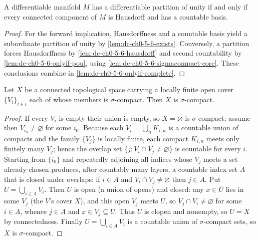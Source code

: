 \begin{theorem}
  \label{thm:dc-ch0-5-6}
  A differentiable manifold $M$ has a differentiable partition of unity if and only
  if every connected component of $M$ is Hausdorff and has a countable basis.
\end{theorem}
\begin{proof}
  \sketch
  \leanok
  For the forward implication, Hausdorffness and a countable basis yield a subordinate
  partition of unity by \cref{lem:dc-ch0-5-6-exists}. Conversely, a partition forces
  Hausdorffness by \cref{lem:dc-ch0-5-6-hausdorff} and second countability by
  \cref{lem:dc-ch0-5-6-onlyif-pou}, using
  \cref{lem:dc-ch0-5-6-sigmacompact-core}. These conclusions combine in
  \cref{lem:dc-ch0-5-6-onlyif-complete}.
\end{proof}

\begin{lemma}
  \label{lem:dc-ch0-5-6-sigmacompact-core}
  \leanok
  Let $X$ be a connected topological space carrying a locally finite open cover
  $\{V_i\}_{i\in\iota}$ each of whose members is $\sigma$-compact. Then $X$ is
  $\sigma$-compact.
\end{lemma}
\begin{proof}
  \sketch
  \leanok
  If every $V_i$ is empty their union is empty, so $X=\varnothing$ is
  $\sigma$-compact; assume then $V_{i_0}\neq\varnothing$ for some $i_0$. Because each
  $V_i=\bigcup_n K_{i,n}$ is a countable union of compacts and the family
  $\{V_j\}$ is locally finite, each compact $K_{i,n}$ meets only finitely many
  $V_j$; hence the overlap set $\{j : V_i\cap V_j\neq\varnothing\}$ is countable for
  every $i$.
  Starting from $\{i_0\}$ and repeatedly adjoining all indices whose $V_j$ meets a
  set already chosen produces, after countably many layers, a countable index set
  $A$ that is closed under overlaps: if $i\in A$ and $V_i\cap V_j\neq\varnothing$
  then $j\in A$. Put $U=\bigcup_{i\in A}V_i$. Then $U$ is open (a union of opens) and
  closed: any $x\in\overline U$ lies in some $V_j$ (the $V$'s cover $X$), and this
  open $V_j$ meets $U$, so $V_j\cap V_i\neq\varnothing$ for some $i\in A$, whence
  $j\in A$ and $x\in V_j\subseteq U$. Thus $U$ is clopen and nonempty, so $U=X$ by
  connectedness. Finally $U=\bigcup_{i\in A}V_i$ is a countable union of
  $\sigma$-compact sets, so $X$ is $\sigma$-compact.
\end{proof}

